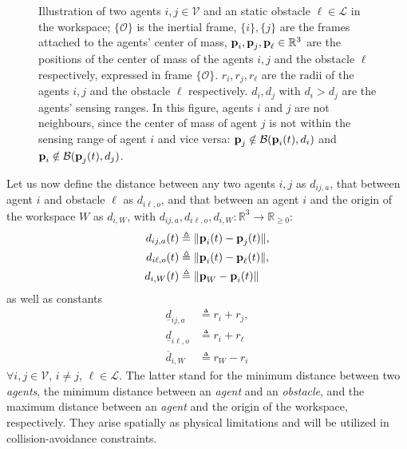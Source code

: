 \begin{figure}[ht!]
	\centering
    
    \caption{Illustration of two agents $i, j \in \mathcal{V}$ and an static
      obstacle $\ell \in \mathcal{L}$ in the workspace; $\{\mathcal{O}\}$ is the inertial
      frame, $\{i\}, \{j\}$ are the frames attached to the agents' center of
      mass, $\bm{\mathbf{p}}_i, \bm{\mathbf{p}}_j, \bm{\mathbf{p}}_{\ell} \in \mathbb{R}^3$ are the
      positions of the center of mass of the agents $i,j$ and the
      obstacle $\ell$ respectively, expressed in frame
      $\{\mathcal{O}\}$. $r_i, r_j, r_{\ell}$ are the radii of the agents $i,j$
      and the obstacle $\ell$ respectively. $d_i, d_j$ with
      $d_i > d_j$ are the agents' sensing ranges.
      In this figure, agents $i$ and $j$ are not neighbours, since the center
      of mass of agent $j$ is not within the sensing range of agent $i$ and vice
      versa: $\bm{\mathbf{p}}_j \notin \mathcal{B}(\bm{\mathbf{p}}_i(t), d_i)$ and
      $\bm{\mathbf{p}}_i \notin \mathcal{B}(\bm{\mathbf{p}}_j(t), d_j)$.}
	\label{fig:two_agents_one_obstacle}
\end{figure}

Let us now define the distance between any two agents $i,j$ as
$d_{ij,a}$, that between agent $i$ and obstacle $\ell$ as $d_{i\ell,o}$,
and that between an agent $i$ and the origin of the workspace $W$ as
$d_{i,W}$, with $d_{ij,a}, d_{i\ell,o}, d_{i,W} : \mathbb{R}^3 \to \mathbb{R}_{\geq 0}$:
\begin{subequations}
	\begin{align}
    d_{ij,a}(t) &\triangleq \| \bm{\mathbf{p}}_i(t) - \bm{\mathbf{p}}_j(t) \|, \\
    d_{i\ell,o}(t) &\triangleq \| \bm{\mathbf{p}}_i(t) - \bm{\mathbf{p}}_\ell(t) \|, \\
    d_{i,W}(t) &\triangleq \| \bm{\mathbf{p}}_W - \bm{\mathbf{p}}_i(t) \|
	\end{align}
\end{subequations}
as well as constants
\begin{subequations}
	\begin{align}
    \underline{d}_{ij, a} &\triangleq r_{i} + r_{j}, \\
    \underline{d}_{i\ell, o} &\triangleq r_{i} + r_{\ell} \\
    \overline{d}_{i,W} &\triangleq r_W - r_i
	\end{align}
\end{subequations}
$\forall i, j \in \mathcal{V}$, $i \neq j$, $\ell \in \mathcal{L}$.
The latter stand for the minimum distance between two \textit{agents}, the
minimum distance between an \textit{agent} and an \textit{obstacle},
and the maximum distance between an \textit{agent} and the origin of the
workspace, respectively. They arise spatially as physical limitations and will
be utilized in collision-avoidance constraints.

